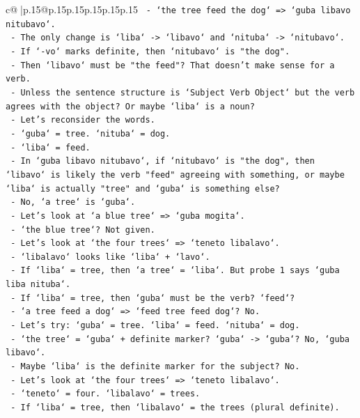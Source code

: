 \documentclass{article}
\begin{document}
{\begin{supertabular}{c@{$\;$}|p{.15\linewidth}@{}p{.15\linewidth}p{.15\linewidth}p{.15\linewidth}p{.15\linewidth}p{.15\linewidth}}
{{{\texttt{  {-} `the tree feed the dog` => `guba libavo nitubavo`.} \\
\texttt{  {-} The only change is `liba` {-}> `libavo` and `nituba` {-}> `nitubavo`.} \\
\texttt{  {-} If `{-}vo` marks definite, then `nitubavo` is "the dog".} \\
\texttt{  {-} Then `libavo` must be "the feed"? That doesn't make sense for a verb.} \\
\texttt{  {-} Unless the sentence structure is `Subject Verb Object` but the verb agrees with the object? Or maybe `liba` is a noun?} \\
\texttt{  {-} Let's reconsider the words.} \\
\texttt{  {-} `guba` = tree. `nituba` = dog.} \\
\texttt{  {-} `liba` = feed.} \\
\texttt{  {-} In `guba libavo nitubavo`, if `nitubavo` is "the dog", then `libavo` is likely the verb "feed" agreeing with something, or maybe `liba` is actually "tree" and `guba` is something else?} \\
\texttt{  {-} No, `a tree` is `guba`.} \\
\texttt{  {-} Let's look at `a blue tree` => `guba mogita`.} \\
\texttt{  {-} `the blue tree`? Not given.} \\
\texttt{  {-} Let's look at `the four trees` => `teneto libalavo`.} \\
\texttt{  {-} `libalavo` looks like `liba` + `lavo`.} \\
\texttt{  {-} If `liba` = tree, then `a tree` = `liba`. But probe 1 says `guba liba nituba`.} \\
\texttt{  {-} If `liba` = tree, then `guba` must be the verb? `feed`?} \\
\texttt{  {-} `a tree feed a dog` => `feed tree feed dog`? No.} \\
\texttt{  {-} Let's try: `guba` = tree. `liba` = feed. `nituba` = dog.} \\
\texttt{  {-} `the tree` = `guba` + definite marker? `guba` {-}> `guba`? No, `guba libavo`.} \\
\texttt{  {-} Maybe `liba` is the definite marker for the subject? No.} \\
\texttt{  {-} Let's look at `the four trees` => `teneto libalavo`.} \\
\texttt{  {-} `teneto` = four. `libalavo` = trees.} \\
\texttt{  {-} If `liba` = tree, then `libalavo` = the trees (plural definite).} \\
}}}
\end{supertabular}}
\end{document}
